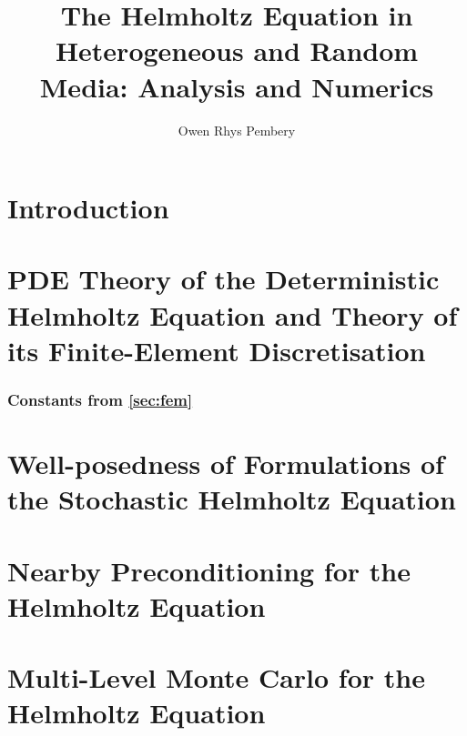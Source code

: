 \documentclass{report}
\title{The Helmholtz Equation in Heterogeneous and Random Media: Analysis and Numerics}
\author{Owen Rhys Pembery}
\begin{document}
\maketitle



\tableofcontents



\chapter{Introduction}\label{chap:intro}


\chapter{PDE Theory of the Deterministic Helmholtz Equation and Theory of its Finite-Element Discretisation}\label{chap:background}




\subsection{Constants from \cref{sec:fem}}\label{app:constants}


%

%

\chapter{Well-posedness of Formulations of the Stochastic Helmholtz Equation}\label{chap:stochastic}
 
















\chapter{Nearby Preconditioning for the Helmholtz Equation}\label{chap:nbpc}


\chapter{Multi-Level Monte Carlo for the Helmholtz Equation}\label{chap:mlmc}
\end{document}
